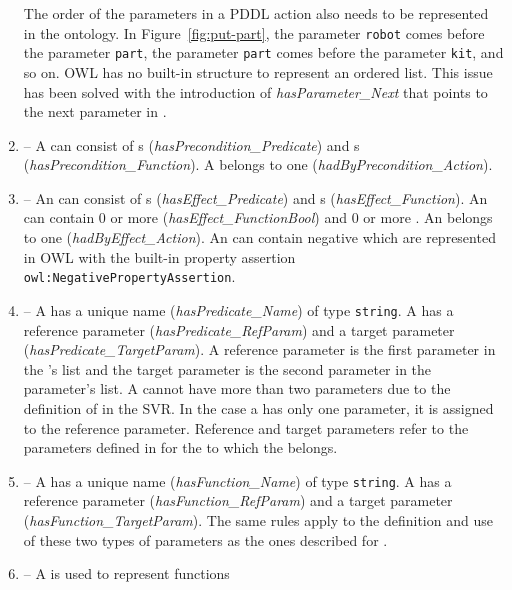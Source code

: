\begin{enumerate}
    The order of the parameters in a PDDL action also needs to be represented
in the ontology. In Figure~\ref{fig:put-part}, the parameter \texttt{robot}
comes before the parameter \texttt{part}, the parameter \texttt{part} comes
before the parameter \texttt{kit}, and so on. OWL has no built-in structure
to represent an ordered list. This issue has been solved with the introduction
of \emph{hasParameter\_Next} that points to the next parameter in .
\item {} -- A  can consist of s
(\emph{hasPrecondition\_Predicate}) and s (\emph{hasPrecondition\_Function}).
A  belongs to one 
(\emph{hadByPrecondition\_Action}).
\item {} -- An  can consist of s
(\emph{hasEffect\_Predicate}) and s (\emph{hasEffect\_Function}).
An  can contain 0 or more  (\emph{hasEffect\_FunctionBool})
and 0 or more . An  belongs to one 
(\emph{hadByEffect\_Action}). An  can contain negative 
which are represented in OWL with the built-in property assertion \texttt{owl:NegativePropertyAssertion}.
\item {} -- A  has a unique name (\emph{hasPredicate\_Name})
of type \texttt{string}. A  has a reference parameter
(\emph{hasPredicate\_RefParam}) and a target parameter (\emph{hasPredicate\_TargetParam}).
A reference parameter is the first parameter in the 's list and the target
parameter is the second parameter in the parameter's list. A  cannot have
more than two parameters due to the definition of  in the SVR. In the
case a  has only one parameter, it is assigned to the reference parameter.
Reference and target parameters refer to the parameters defined in 
for the  to which the  belongs.
\item {} -- A  has a unique name (\emph{hasFunction\_Name})
of type \texttt{string}. A  has a reference parameter (\emph{hasFunction\_RefParam})
and a target parameter (\emph{hasFunction\_TargetParam}). The same rules apply to the
definition and use of these two types of parameters as the ones described for .
\item {} -- A  is used to represent functions

\end{enumerate}
